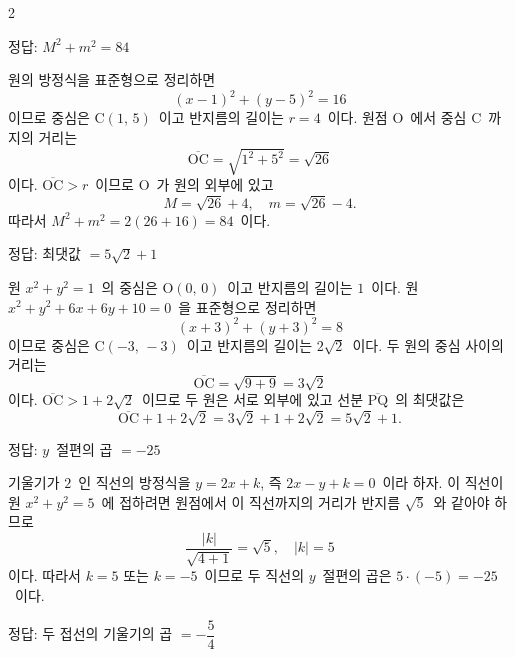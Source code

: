 \documentclass[10pt,fleqn]{article}
\begin{document}
\begin{multicols*}{2}
\begin{dmanswerbox}
정답: $M^2+m^2=84$
\end{dmanswerbox}

원의 방정식을 표준형으로 정리하면
\[ (x-1)^2 + (y-5)^2 = 16 \]
이므로 중심은 $\mathrm{C}(1,\, 5)$\ 이고 반지름의 길이는 $r = 4$\ 이다. 원점 $\mathrm{O}$\ 에서 중심 $\mathrm{C}$\ 까지의 거리는
\[ \overline{\mathrm{OC}} = \sqrt{1^2 + 5^2} = \sqrt{26} \]
이다. $\overline{\mathrm{OC}} > r$\ 이므로 $\mathrm{O}$\ 가 원의 외부에 있고
\[ M = \sqrt{26} + 4,\quad m = \sqrt{26} - 4. \]
따라서 $M^2 + m^2 = 2(26 + 16) = 84$\ 이다.

\begin{dmanswerbox}
정답: 최댓값 $=5\sqrt{2}+1$
\end{dmanswerbox}

원 $x^2 + y^2 = 1$\ 의 중심은 $\mathrm{O}(0,\, 0)$\ 이고 반지름의 길이는 $1$\ 이다. 원 $x^2 + y^2 + 6x + 6y + 10 = 0$\ 을 표준형으로 정리하면
\[ (x+3)^2 + (y+3)^2 = 8 \]
이므로 중심은 $\mathrm{C}(-3,\, -3)$\ 이고 반지름의 길이는 $2\sqrt{2}$\ 이다. 두 원의 중심 사이의 거리는
\[ \overline{\mathrm{OC}} = \sqrt{9 + 9} = 3\sqrt{2} \]
이다. $\overline{\mathrm{OC}} > 1 + 2\sqrt{2}$\ 이므로 두 원은 서로 외부에 있고 선분 $\overline{\mathrm{PQ}}$\ 의 최댓값은
\[ \overline{\mathrm{OC}} + 1 + 2\sqrt{2} = 3\sqrt{2} + 1 + 2\sqrt{2} = 5\sqrt{2} + 1. \]

\begin{dmanswerbox}
정답: $y$\ 절편의 곱 $=-25$
\end{dmanswerbox}

기울기가 $2$\ 인 직선의 방정식을 $y = 2x + k$, 즉 $2x - y + k = 0$\ 이라 하자. 이 직선이 원 $x^2 + y^2 = 5$\ 에 접하려면 원점에서 이 직선까지의 거리가 반지름 $\sqrt{5}$\ 와 같아야 하므로
\[ \dfrac{|k|}{\sqrt{4 + 1}} = \sqrt{5},\quad |k| = 5 \]
이다. 따라서 $k = 5$ 또는 $k = -5$\ 이므로 두 직선의 $y$\ 절편의 곱은 $5 \cdot (-5) = -25$\ 이다.

\begin{dmanswerbox}
정답: 두 접선의 기울기의 곱 $= -\dfrac{5}{4}$
\end{dmanswerbox}


\end{multicols*}
\end{document}
